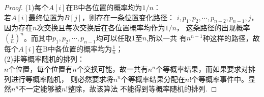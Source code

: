 \begin{proof}
    (1)每个$A[i]$在B中各位置的概率均为$1/n$：\\
    若$A[i]$最终位置为$B[j]$，则存在一条位置变化路径：
    $i,p_1,p_2,\cdots,p_{n-2},p_{n-1},j$，因为存在$n$次交换且每次交换后在各位置概率均作为$1/n$，
    这条路径的出现概率$(\frac{1}{n})^n$。而其中$p_1,p_2,\cdots,p_{n-1}$均可以任取$1$至$n$,所以一共
    有$n^{n-1}$种这样的路径，故每个$A[i]$在B中各位置的概率均为$\frac{1}{n}$；\\
    (2)非等概率随机的排列：\\
    $n$个位置，每个位置有$n$个交换可能，故一共有$n^n$个等概率结果，而如果要求对排列进行等概率随机，
    则必然要求将$n^n$个等概率结果分配在$n!$个等概率事件中。显然$n^n$不一定能够被$n!$整除，故该算法
    不能得到等概率随机的排列.

    



\end{proof}